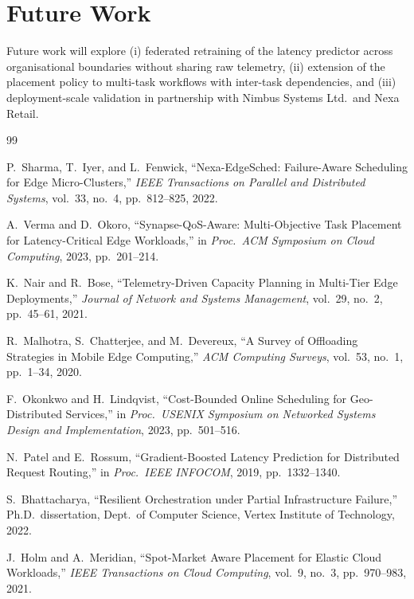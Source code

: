 \section{Future Work}
Future work will explore (i) federated retraining of the latency predictor across organisational boundaries without sharing raw telemetry, (ii) extension of the placement policy to multi-task workflows with inter-task dependencies, and (iii) deployment-scale validation in partnership with Nimbus Systems Ltd.\ and Nexa Retail.

\begin{thebibliography}{99}

 P.\ Sharma, T.\ Iyer, and L.\ Fenwick, ``Nexa-EdgeSched: Failure-Aware Scheduling for Edge Micro-Clusters,'' \textit{IEEE Transactions on Parallel and Distributed Systems}, vol.\ 33, no.\ 4, pp.\ 812--825, 2022.

 A.\ Verma and D.\ Okoro, ``Synapse-QoS-Aware: Multi-Objective Task Placement for Latency-Critical Edge Workloads,'' in \textit{Proc.\ ACM Symposium on Cloud Computing}, 2023, pp.\ 201--214.

 K.\ Nair and R.\ Bose, ``Telemetry-Driven Capacity Planning in Multi-Tier Edge Deployments,'' \textit{Journal of Network and Systems Management}, vol.\ 29, no.\ 2, pp.\ 45--61, 2021.

 R.\ Malhotra, S.\ Chatterjee, and M.\ Devereux, ``A Survey of Offloading Strategies in Mobile Edge Computing,'' \textit{ACM Computing Surveys}, vol.\ 53, no.\ 1, pp.\ 1--34, 2020.

 F.\ Okonkwo and H.\ Lindqvist, ``Cost-Bounded Online Scheduling for Geo-Distributed Services,'' in \textit{Proc.\ USENIX Symposium on Networked Systems Design and Implementation}, 2023, pp.\ 501--516.

 N.\ Patel and E.\ Rossum, ``Gradient-Boosted Latency Prediction for Distributed Request Routing,'' in \textit{Proc.\ IEEE INFOCOM}, 2019, pp.\ 1332--1340.

 S.\ Bhattacharya, ``Resilient Orchestration under Partial Infrastructure Failure,'' Ph.D.\ dissertation, Dept.\ of Computer Science, Vertex Institute of Technology, 2022.

 J.\ Holm and A.\ Meridian, ``Spot-Market Aware Placement for Elastic Cloud Workloads,'' \textit{IEEE Transactions on Cloud Computing}, vol.\ 9, no.\ 3, pp.\ 970--983, 2021.

\end{thebibliography}

\appendix
